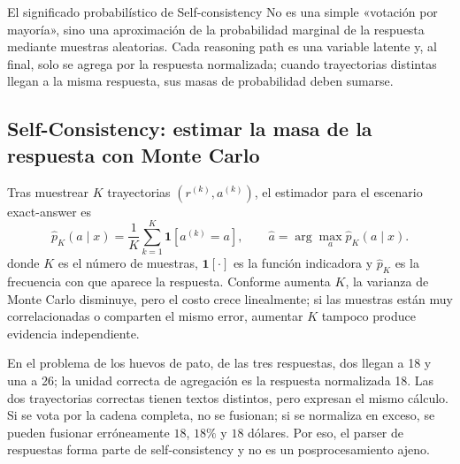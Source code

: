 \begin{importantbox}{El significado probabilístico de Self-consistency}
No es una simple «votación por mayoría», sino una aproximación de la probabilidad marginal de la respuesta mediante muestras aleatorias. Cada reasoning path es una variable latente y, al final, solo se agrega por la respuesta normalizada; cuando trayectorias distintas llegan a la misma respuesta, sus masas de probabilidad deben sumarse.
\end{importantbox}


\subsection{Self-Consistency: estimar la masa de la respuesta con Monte Carlo}

Tras muestrear $K$ trayectorias $(r^{(k)},a^{(k)})$, el estimador para el escenario exact-answer es
\[
\widehat p_K(a\mid x)=\frac{1}{K}\sum_{k=1}^{K}\mathbf 1[a^{(k)}=a],
\qquad
\hat a=\arg\max_a\widehat p_K(a\mid x).
\]
donde $K$ es el número de muestras, $\mathbf 1[\cdot]$ es la función indicadora y $\widehat p_K$ es la frecuencia con que aparece la respuesta. Conforme aumenta $K$, la varianza de Monte Carlo disminuye, pero el costo crece linealmente; si las muestras están muy correlacionadas o comparten el mismo error, aumentar $K$ tampoco produce evidencia independiente.



En el problema de los huevos de pato, de las tres respuestas, dos llegan a 18 y una a 26; la unidad correcta de agregación es la respuesta normalizada 18. Las dos trayectorias correctas tienen textos distintos, pero expresan el mismo cálculo. Si se vota por la cadena completa, no se fusionan; si se normaliza en exceso, se pueden fusionar erróneamente $18$, $18\%$ y $18$ dólares. Por eso, el parser de respuestas forma parte de self-consistency y no es un posprocesamiento ajeno.

